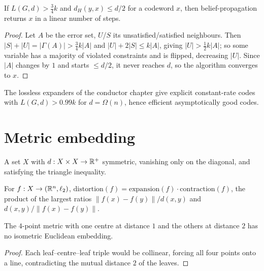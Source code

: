 \begin{theorem}
  \label{thm:ss-decoding}
  If $L(G,d)>\tfrac34k$ and $d_H(y,x)\le d/2$ for a codeword $x$, then
  belief-propagation returns $x$ in a linear number of steps.
\end{theorem}
\begin{proof}
  Let $A$ be the error set, $U$/$S$ its unsatisfied/satisfied neighbours. Then
  $|S|+|U|=|\Gamma(A)|>\tfrac34k|A|$ and $|U|+2|S|\le k|A|$, giving
  $|U|>\tfrac12k|A|$; so some variable has a majority of violated constraints and
  is flipped, decreasing $|U|$. Since $|A|$ changes by $1$ and starts $\le d/2$,
  it never reaches $d$, so the algorithm converges to $x$.
\end{proof}

\begin{claim}
  \label{claim:lossless-codes}
  \notready
  The lossless expanders of the conductor chapter give explicit constant-rate
  codes with $L(G,d)>0.99k$ for $d=\Omega(n)$, hence efficient asymptotically
  good codes.
\end{claim}


\chapter{Metric embedding}

\begin{definition}
  \label{def:metric-space}
  \mathlibok
  A set $X$ with $d:X\times X\to\mathbb{R}^+$ symmetric, vanishing only on the diagonal,
  and satisfying the triangle inequality.
\end{definition}

\begin{definition}
  \label{def:distortion}
  For $f:X\to(\mathbb{R}^n,\ell_2)$, $\mathrm{distortion}(f)=
  \mathrm{expansion}(f)\cdot\mathrm{contraction}(f)$, the product of the largest
  ratios $\|f(x)-f(y)\|/d(x,y)$ and $d(x,y)/\|f(x)-f(y)\|$.
\end{definition}

\begin{claim}
  \label{claim:star-not-embeddable}
  The $4$-point metric with one centre at distance $1$ and the others at
  distance $2$ has no isometric Euclidean embedding.
\end{claim}
\begin{proof}
  Each leaf--centre--leaf triple would be collinear, forcing all four points
  onto a line, contradicting the mutual distance $2$ of the leaves.
\end{proof}

